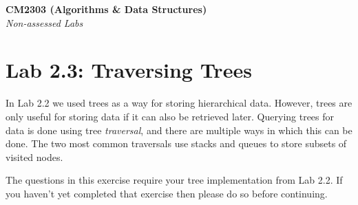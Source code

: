\documentclass[11pt,a4paper]{report}
\begin{document}
\noindent\Large\textbf{CM2303 (Algorithms \& Data Structures)}\\
\noindent\large\textit{Non-assessed Labs}
\vskip30pt

\section*{Lab 2.3: Traversing Trees}

In Lab 2.2 we used trees as a way for storing hierarchical data. However, trees are only useful for storing data if it can also be retrieved later. Querying trees for data is done using tree \textit{traversal}, and there are multiple ways in which this can be done. The two most common traversals use stacks and queues to store subsets of visited nodes.

The questions in this exercise require your tree implementation from Lab 2.2. If you haven't yet completed that exercise then please do so before continuing. 
\end{document}
